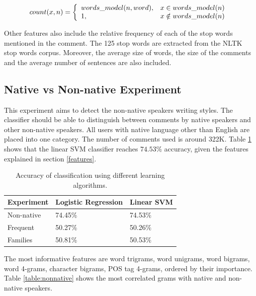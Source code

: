 \documentclass[10pt,a5paper,twoside]{article}
\begin{document}
\[
  count(x, n) = \left\{
  \begin{array}{l l}
    words\_model(n, word), & x \in words\_model(n)\\
    1, & x \notin words\_model(n)\\
  \end{array} \right.
\]

Other features also include the relative frequency of each of the stop words
mentioned in the comment. The 125 stop words are extracted from the NLTK stop
words corpus\cite{nltk}. Moreover, the average size of words, the size of the
comments and the average number of sentences are also included.

\subsection{Native vs Non-native Experiment}
\label{exps}
This experiment aims to detect the non-native speakers writing styles. The
classifier should be able to distinguish between comments by native speakers
and other non-native speakers.
All users with native language other than English are placed into one category.
The number of comments used is around 322K. Table 
\ref{table:results} shows that the linear SVM classifier reaches
$74.53\%$ accuracy, given the features explained in section \ref{features}.
\begin{table}
  \begin{center}
  \begin{tabular}{l|ll}
	Experiment & Logistic Regression & Linear SVM
	\\\hline
	Non-native & 74.45\% & 74.53\%\\
	Frequent & 50.27\% & 50.26\%\\
	Families & 50.81\% &50.53\% \\
\end{tabular}
\caption{Accuracy of classification using different learning algorithms.}
\label{table:results}
\end{center}
\end{table}

The most informative features are word trigrams, word unigrams, word bigrams,
word 4-grams, character bigrams, POS tag 4-grams, ordered by their importance.
Table \ref{table:nonnative} shows the most correlated grams with native and non-native
speakers.
\end{document}
